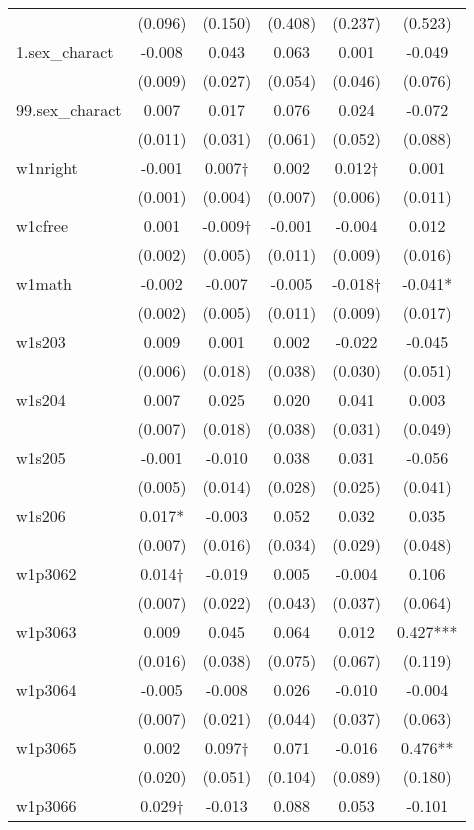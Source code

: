 \documentclass[]{article}
\begin{document}
\begin{tabular}{lccccc}
 & (0.096) & (0.150) & (0.408) & (0.237) & (0.523) \\
1.sex\_charact & -0.008 & 0.043 & 0.063 & 0.001 & -0.049 \\
 & (0.009) & (0.027) & (0.054) & (0.046) & (0.076) \\
99.sex\_charact & 0.007 & 0.017 & 0.076 & 0.024 & -0.072 \\
 & (0.011) & (0.031) & (0.061) & (0.052) & (0.088) \\
w1nright & -0.001 & 0.007† & 0.002 & 0.012† & 0.001 \\
 & (0.001) & (0.004) & (0.007) & (0.006) & (0.011) \\
w1cfree & 0.001 & -0.009† & -0.001 & -0.004 & 0.012 \\
 & (0.002) & (0.005) & (0.011) & (0.009) & (0.016) \\
w1math & -0.002 & -0.007 & -0.005 & -0.018† & -0.041* \\
 & (0.002) & (0.005) & (0.011) & (0.009) & (0.017) \\
w1s203 & 0.009 & 0.001 & 0.002 & -0.022 & -0.045 \\
 & (0.006) & (0.018) & (0.038) & (0.030) & (0.051) \\
w1s204 & 0.007 & 0.025 & 0.020 & 0.041 & 0.003 \\
 & (0.007) & (0.018) & (0.038) & (0.031) & (0.049) \\
w1s205 & -0.001 & -0.010 & 0.038 & 0.031 & -0.056 \\
 & (0.005) & (0.014) & (0.028) & (0.025) & (0.041) \\
w1s206 & 0.017* & -0.003 & 0.052 & 0.032 & 0.035 \\
 & (0.007) & (0.016) & (0.034) & (0.029) & (0.048) \\
w1p3062 & 0.014† & -0.019 & 0.005 & -0.004 & 0.106 \\
 & (0.007) & (0.022) & (0.043) & (0.037) & (0.064) \\
w1p3063 & 0.009 & 0.045 & 0.064 & 0.012 & 0.427*** \\
 & (0.016) & (0.038) & (0.075) & (0.067) & (0.119) \\
w1p3064 & -0.005 & -0.008 & 0.026 & -0.010 & -0.004 \\
 & (0.007) & (0.021) & (0.044) & (0.037) & (0.063) \\
w1p3065 & 0.002 & 0.097† & 0.071 & -0.016 & 0.476** \\
 & (0.020) & (0.051) & (0.104) & (0.089) & (0.180) \\
w1p3066 & 0.029† & -0.013 & 0.088 & 0.053 & -0.101 \\

\end{tabular}
\end{document}
